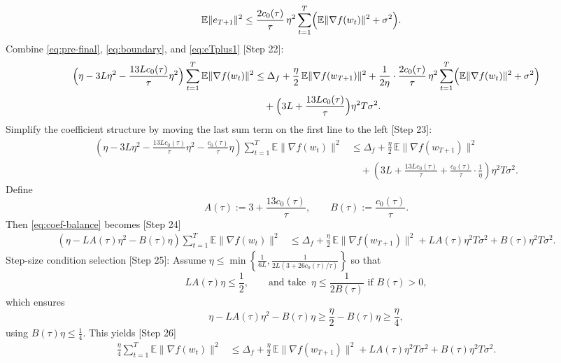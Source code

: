 \documentclass[11pt]{article}
\newcommand{\E}{\mathbb{E}}
\begin{document}
\begin{align}
\E\|e_{T+1}\|^2
&\le \frac{2 c_0(\tau)}{\tau}\,\eta^2 \sum_{t=1}^{T} \Bigl(\E\|\nabla f(w_t)\|^2 + \sigma^2\Bigr). \label{eq:eTplus1}
\end{align}
Combine \eqref{eq:pre-final}, \eqref{eq:boundary}, and \eqref{eq:eTplus1} [Step 22]:
\begin{align}
\Bigl(\eta - 3L\eta^2 - \frac{13L c_0(\tau)}{\tau}\eta^2\Bigr) \sum_{t=1}^T \E\|\nabla f(w_t)\|^2
&\le \Delta_f + \frac{\eta}{2}\,\E\|\nabla f(w_{T+1})\|^2 + \frac{1}{2\eta}\cdot \frac{2 c_0(\tau)}{\tau}\,\eta^2 \sum_{t=1}^{T} \Bigl(\E\|\nabla f(w_t)\|^2 + \sigma^2\Bigr)\nonumber\\
&\quad + \Bigl(3L + \frac{13L c_0(\tau)}{\tau}\Bigr)\eta^2 T \sigma^2. \label{eq:almost-final}
\end{align}
Simplify the coefficient structure by moving the last sum term on the first line to the left [Step 23]:
\begin{align}
\left(\eta - 3L\eta^2 - \frac{13L c_0(\tau)}{\tau}\eta^2 - \frac{c_0(\tau)}{\tau}\eta\right)
\sum_{t=1}^T \E\|\nabla f(w_t)\|^2
&\le \Delta_f + \frac{\eta}{2}\,\E\|\nabla f(w_{T+1})\|^2 \nonumber\\
&\quad + \left(3L + \frac{13L c_0(\tau)}{\tau} + \frac{c_0(\tau)}{\tau}\cdot \frac{1}{\eta}\right)\eta^2 T \sigma^2. \label{eq:coef-balance}
\end{align}
Define
\[
A(\tau) := 3 + \frac{13 c_0(\tau)}{\tau},\qquad
B(\tau) := \frac{c_0(\tau)}{\tau}.
\]
Then \eqref{eq:coef-balance} becomes [Step 24]
\begin{align}
\left(\eta - L A(\tau)\eta^2 - B(\tau)\eta\right)
\sum_{t=1}^T \E\|\nabla f(w_t)\|^2
&\le \Delta_f + \frac{\eta}{2}\,\E\|\nabla f(w_{T+1})\|^2 + L A(\tau)\eta^2 T \sigma^2 + B(\tau)\eta^2 T \sigma^2. \label{eq:compact}
\end{align}
Step-size condition selection [Step 25]: 
Assume $\eta \le \min\left\{\frac{1}{6L}, \frac{1}{2L(3+26c_0(\tau)/\tau)}\right\}$ so that
\[
L A(\tau)\eta \le \frac{1}{2},\qquad \text{and take }\ \eta \le \frac{1}{2 B(\tau)} \text{ if } B(\tau)>0,
\]
which ensures
\[
\eta - L A(\tau)\eta^2 - B(\tau)\eta \ge \frac{\eta}{2} - B(\tau)\eta \ge \frac{\eta}{4},
\]
using $B(\tau)\eta \le \frac{1}{4}$. This yields [Step 26]
\begin{align}
\frac{\eta}{4}\sum_{t=1}^T \E\|\nabla f(w_t)\|^2
&\le \Delta_f + \frac{\eta}{2}\,\E\|\nabla f(w_{T+1})\|^2 + L A(\tau)\eta^2 T \sigma^2 + B(\tau)\eta^2 T \sigma^2. \label{eq:pre-average}
\end{align}
\end{document}
